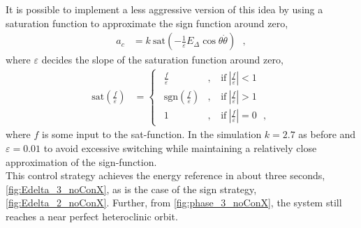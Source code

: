 %
%
%
It is possible to implement a less aggressive version of this idea by using a saturation function to approximate the sign function around zero,
\begin{align}
  a_c &= k\ \mathrm{sat}(-\tfrac{1}{\varepsilon}E_\Delta \cos \theta \dot{\theta})  \ \ \ ,   \label{eq:accControlLaw2_2} 
\end{align}
where $\varepsilon$ decides the slope of the saturation function around zero,
\begin{align}
  \text{sat}\left( \frac{f}{\varepsilon} \right) &=
  \begin{cases}
    \ \ \frac{f}{\varepsilon}                             &, \ \ \ \ \mathrm{if} \ | \frac{f}{\varepsilon} |  < 1 \\
    \ \ \mathrm{sgn}\left( \frac{f}{\varepsilon} \right)  &, \ \ \ \ \mathrm{if} \ | \frac{f}{\varepsilon} |  > 1 \\
    \ \ 1                                                 &, \ \ \ \ \mathrm{if} \ | \frac{f}{\varepsilon} | = 0 \ \ \ ,
  \end{cases}
  \label{eq:satuationFunction1}
\end{align}
where $f$ is some input to the sat-function.
In the simulation $k = 2.7$ as before and $\varepsilon = 0.01$ to avoid excessive switching while maintaining a relatively close approximation of the sign-function.\\
This control strategy achieves the energy reference in about three seconds, \autoref{fig:Edelta_3_noConX}, as is the case of the sign strategy, \autoref{fig:Edelta_2_noConX}. Further, from \autoref{fig:phase_3_noConX}, the system still reaches a near perfect heteroclinic orbit.
%
